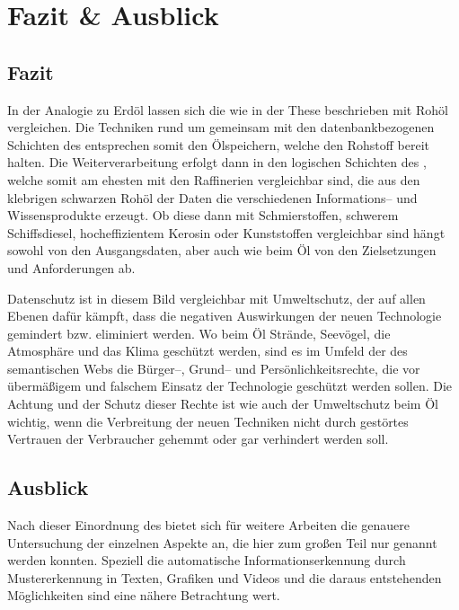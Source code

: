 \section{Fazit \& Ausblick}

\subsection{Fazit}

In der Analogie zu Erdöl lassen sich die  wie in der These beschrieben mit Rohöl vergleichen. Die Techniken rund um  gemeinsam mit den datenbankbezogenen Schichten des  entsprechen somit den Ölspeichern, welche den Rohstoff bereit halten. Die Weiterverarbeitung erfolgt dann in den logischen Schichten des , welche somit am ehesten mit den Raffinerien vergleichbar sind, die aus den klebrigen schwarzen Rohöl der Daten die verschiedenen Informations-- und Wissensprodukte erzeugt. Ob diese dann mit Schmierstoffen, schwerem Schiffsdiesel, hocheffizientem Kerosin oder Kunststoffen vergleichbar sind hängt sowohl von den Ausgangsdaten, aber auch wie beim Öl von den Zielsetzungen und Anforderungen ab.

Datenschutz ist in diesem Bild vergleichbar mit Umweltschutz, der auf allen Ebenen dafür kämpft, dass die negativen Auswirkungen der neuen Technologie gemindert bzw. eliminiert werden. Wo beim Öl Strände, Seevögel, die Atmosphäre und das Klima geschützt werden, sind es  im Umfeld der des semantischen Webs die Bürger--, Grund-- und Persönlichkeitsrechte, die vor übermäßigem und falschem Einsatz der Technologie geschützt werden sollen. Die Achtung und der Schutz dieser Rechte ist wie auch der Umweltschutz beim Öl wichtig, wenn die Verbreitung der neuen Techniken nicht durch gestörtes Vertrauen der Verbraucher gehemmt oder gar verhindert werden soll.

\subsection{Ausblick}
\label{ausblick}

Nach dieser Einordnung des  bietet sich für weitere Arbeiten die genauere Untersuchung der einzelnen Aspekte an, die hier zum großen Teil nur genannt werden konnten. Speziell die automatische Informationserkennung durch Mustererkennung in Texten, Grafiken und Videos und die daraus entstehenden Möglichkeiten sind eine nähere Betrachtung wert. 

